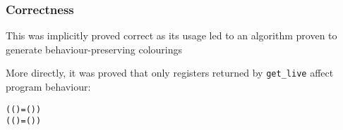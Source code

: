 \documentclass{beamer}
\begin{document}
\begin{frame}[containsverbatim]
\frametitle{Correctness}
This was implicitly proved correct as its usage led to an algorithm proven to generate behaviour-preserving colourings

More directly, it was proved that only registers returned by \texttt{get\_live} affect program behaviour:

\begin{alltt}\small
	(  (  ) =   (  )) \HOLTokenImp{}
( (   )  =  (   ) )
\end{alltt}
\end{frame}
\end{document}
